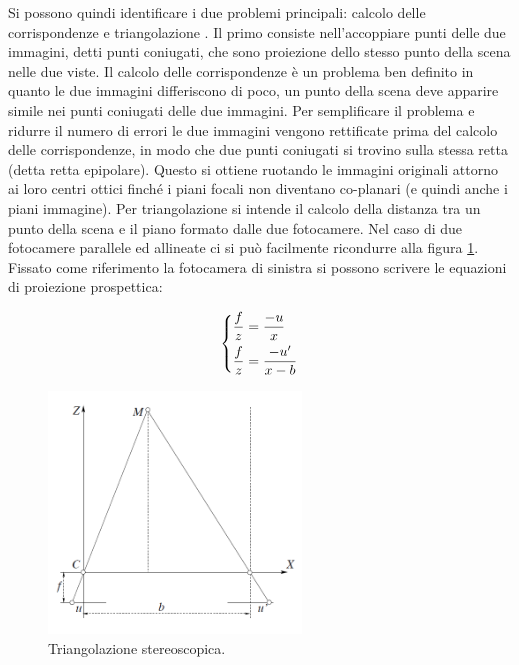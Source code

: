 \documentclass[12pt]{report}
\begin{document}
			Si possono quindi identificare i due problemi principali: calcolo delle corrispondenze e triangolazione \cite{fusiello}.\newline
			Il primo consiste nell'accoppiare punti delle due immagini, detti punti coniugati, che sono proiezione dello stesso punto della scena nelle due viste. Il calcolo delle corrispondenze è un problema ben definito in quanto le due immagini differiscono di poco, un punto della scena deve apparire simile nei punti coniugati delle due immagini. Per semplificare il problema e ridurre il numero di errori le due immagini vengono rettificate prima del calcolo delle corrispondenze, in modo che due punti coniugati si trovino sulla stessa retta (detta retta epipolare). Questo si ottiene ruotando le immagini originali attorno ai loro centri ottici finché i piani 
			focali non diventano co-planari (e quindi anche i piani immagine).\newline
			Per triangolazione si intende il calcolo della distanza tra un punto della scena e il piano formato dalle due fotocamere. Nel caso di due fotocamere parallele ed allineate ci si può facilmente ricondurre alla figura \ref{fig:triangolazione}.\newline
			Fissato come riferimento la fotocamera di sinistra si possono scrivere le equazioni di proiezione prospettica:
			
			\begin{equation}
				\begin{dcases}
					\frac{f}{z}=\frac{-u}{x} \\
					\frac{f}{z}=\frac{-u'}{x-b}
				\end{dcases}
				\label{eq:sistema}
			\end{equation}
			
			\begin{figure}[]
				\centering
				\includegraphics[width=0.6\textwidth]{./figures/Triangolazione_stereoscopica.png}
				\caption{Triangolazione stereoscopica.}
				\label{fig:triangolazione}
			\end{figure}
			
\end{document}
